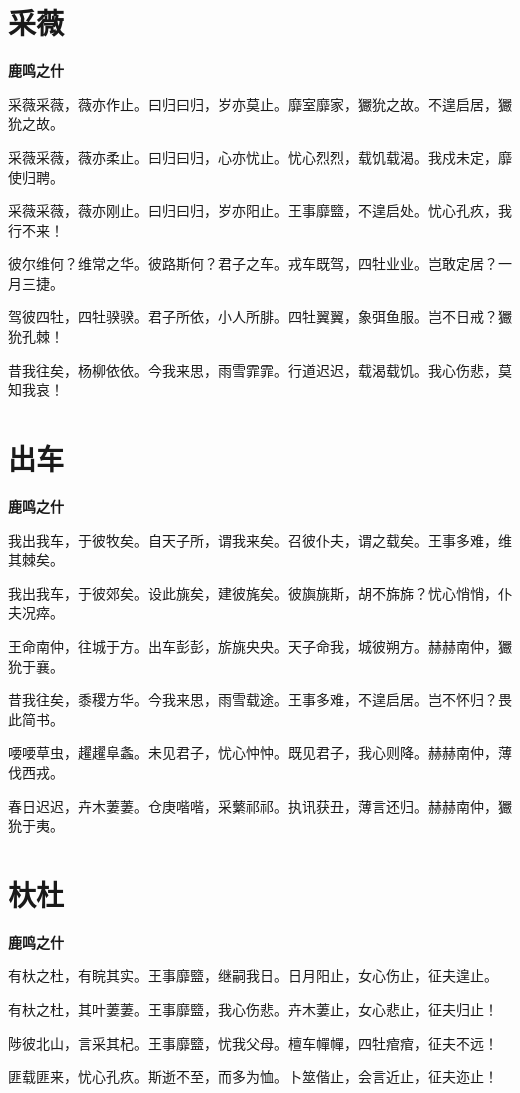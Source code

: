 \documentclass[12pt,a4paper]{ctexbook}
\begin{document}
\section{采薇}
\textbf{鹿鸣之什}\par\vspace{0.5em}
采薇采薇，薇亦作止。曰归曰归，岁亦莫止。靡室靡家，玁狁之故。不遑启居，玁狁之故。\par
采薇采薇，薇亦柔止。曰归曰归，心亦忧止。忧心烈烈，载饥载渴。我戍未定，靡使归聘。\par
采薇采薇，薇亦刚止。曰归曰归，岁亦阳止。王事靡盬，不遑启处。忧心孔疚，我行不来！\par
彼尔维何？维常之华。彼路斯何？君子之车。戎车既驾，四牡业业。岂敢定居？一月三捷。\par
驾彼四牡，四牡骙骙。君子所依，小人所腓。四牡翼翼，象弭鱼服。岂不日戒？玁狁孔棘！\par
昔我往矣，杨柳依依。今我来思，雨雪霏霏。行道迟迟，载渴载饥。我心伤悲，莫知我哀！\par

\section{出车}
\textbf{鹿鸣之什}\par\vspace{0.5em}
我出我车，于彼牧矣。自天子所，谓我来矣。召彼仆夫，谓之载矣。王事多难，维其棘矣。\par
我出我车，于彼郊矣。设此旐矣，建彼旄矣。彼旟旐斯，胡不旆旆？忧心悄悄，仆夫况瘁。\par
王命南仲，往城于方。出车彭彭，旂旐央央。天子命我，城彼朔方。赫赫南仲，玁狁于襄。\par
昔我往矣，黍稷方华。今我来思，雨雪载途。王事多难，不遑启居。岂不怀归？畏此简书。\par
喓喓草虫，趯趯阜螽。未见君子，忧心忡忡。既见君子，我心则降。赫赫南仲，薄伐西戎。\par
春日迟迟，卉木萋萋。仓庚喈喈，采蘩祁祁。执讯获丑，薄言还归。赫赫南仲，玁狁于夷。\par

\section{杕杜}
\textbf{鹿鸣之什}\par\vspace{0.5em}
有杕之杜，有睆其实。王事靡盬，继嗣我日。日月阳止，女心伤止，征夫遑止。\par
有杕之杜，其叶萋萋。王事靡盬，我心伤悲。卉木萋止，女心悲止，征夫归止！\par
陟彼北山，言采其杞。王事靡盬，忧我父母。檀车幝幝，四牡痯痯，征夫不远！\par
匪载匪来，忧心孔疚。斯逝不至，而多为恤。卜筮偕止，会言近止，征夫迩止！\par
\end{document}

